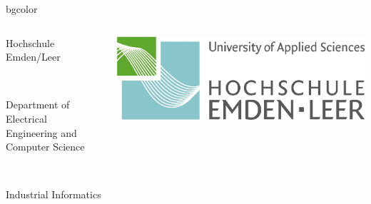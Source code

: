 {%
\begin{beamercolorbox}[rounded=true, center]{bgcolor}
\begin{columns}[T]
\begin{column}{9cm}
{\color{gray}\begin{tiny}Hochschule Emden/Leer\end{tiny}} \\ 
{\color{gray}\begin{tiny}Department of Electrical Engineering and Computer Science\end{tiny}} \\ 
{\color{gray}\begin{tiny}Industrial Informatics\end{tiny}} \\
\end{column}
\begin{column}{2cm}
\includegraphics[scale=0.25]{img/technik.jpg}
\end{column}
\end{columns}
\end{beamercolorbox}
 }
\insertsectionhead
\insertsubsectionhead
{}
\usebackgroundtemplate
{%
      \rule{0pt}{\paperheight}%
      \hspace*{\paperwidth}%
 }


